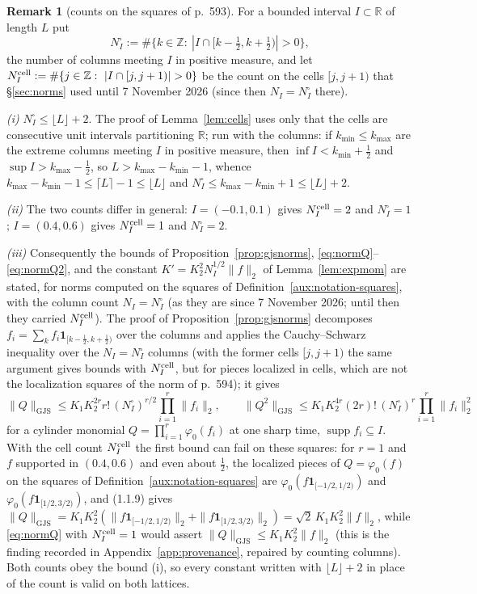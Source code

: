 \documentclass[11pt,a4paper]{article}
\theoremstyle{plain}
\theoremstyle{definition}
\theoremstyle{plain}
\theoremstyle{definition}
\newtheorem{auxrem}[auxlemma]{Remark}
\newcommand{\R}{\mathbb{R}}
\newcommand{\Z}{\mathbb{Z}}
\DeclareMathOperator{\supp}{supp}
\newcommand{\GJS}[1]{\lVert #1\rVert_{\mathrm{GJS}}}   %
\begin{document}
\begin{auxrem}[counts on the squares of p.~593]\label{aux:notation-counts}
For a bounded interval $I\subset\R$ of length $L$ put
\[
 N^{\square}_I:=\#\{k\in\Z:\ |I\cap[k-\tfrac12,k+\tfrac12)|>0\},
\]
the number of columns meeting $I$ in positive measure, and let
$N^{\rm cell}_I:=\#\{j\in\Z:\ |I\cap[j,j+1)|>0\}$ be the count on the cells $[j,j+1)$ that
\S\ref{sec:norms} used until 7 November 2026 (since then $N_I=N^\square_I$ there).

\emph{(i)} $N^{\square}_I\le\lfloor L\rfloor+2$.  The proof of Lemma~\ref{lem:cells}
uses only that the cells are consecutive unit intervals partitioning $\R$; run with the
columns: if $k_{\min}\le k_{\max}$ are the extreme columns meeting $I$ in positive measure,
then $\inf I<k_{\min}+\frac12$ and $\sup I>k_{\max}-\frac12$, so
$L>k_{\max}-k_{\min}-1$, whence $k_{\max}-k_{\min}-1\le\lceil L\rceil-1\le\lfloor
L\rfloor$ and $N^{\square}_I\le k_{\max}-k_{\min}+1\le\lfloor L\rfloor+2$.

\emph{(ii)} The two counts differ in general: $I=(-0.1,0.1)$ gives $N^{\rm cell}_I=2$ and
$N^{\square}_I=1$; $I=(0.4,0.6)$ gives $N^{\rm cell}_I=1$ and $N^{\square}_I=2$.

\emph{(iii)} Consequently the bounds of Proposition~\ref{prop:gjsnorms},
\eqref{eq:normQ}--\eqref{eq:normQ2}, and the constant $K'=K_2^2N_I^{1/2}\|f\|_2$ of
Lemma~\ref{lem:expmom} are stated, for norms computed on the squares of
Definition~\ref{aux:notation-squares}, with the column count $N_I=N^{\square}_I$ (as they are
since 7 November 2026; until then they carried $N^{\rm cell}_I$).  The proof of
Proposition~\ref{prop:gjsnorms} decomposes $f_i=\sum_kf_i\mathbf 1_{[k-\frac12,k+\frac12)}$ over
the columns and applies the Cauchy--Schwarz inequality over the $N_I=N^\square_I$ columns
(with the former cells $[j,j+1)$ the same argument gives bounds with $N^{\rm cell}_I$, but for
pieces localized in cells, which are not the localization squares of the norm of p.~594); it
gives
\[
 \GJS{Q}\le K_1K_2^{2r}r!\,(N^{\square}_I)^{r/2}\prod_{i=1}^r\|f_i\|_2 ,\qquad
 \GJS{Q^2}\le K_1K_2^{4r}(2r)!\,(N^{\square}_I)^{r}\prod_{i=1}^r\|f_i\|_2^2
 \tag{N.a}
\]
for a cylinder monomial $Q=\prod_{i=1}^r\varphi_0(f_i)$ at one sharp time, $\supp
f_i\subseteq I$.  With the cell count $N^{\rm cell}_I$ the first bound can fail on these squares: for $r=1$ and
$f$ supported in $(0.4,0.6)$ and even about $\frac12$, the localized pieces of
$Q=\varphi_0(f)$ on the squares of Definition~\ref{aux:notation-squares} are
$\varphi_0(f\mathbf 1_{[-1/2,1/2)})$ and $\varphi_0(f\mathbf 1_{[1/2,3/2)})$, and (1.1.9)
gives $\GJS{Q}=K_1K_2^2(\|f\mathbf 1_{[-1/2,1/2)}\|_2+\|f\mathbf
1_{[1/2,3/2)}\|_2)=\sqrt2\,K_1K_2^2\|f\|_2$, while \eqref{eq:normQ} with $N^{\rm cell}_I=1$
would assert $\GJS{Q}\le K_1K_2^2\|f\|_2$ (this is the finding recorded in
Appendix~\ref{app:provenance}, repaired by counting columns).  Both counts obey the bound
(i), so every constant written with $\lfloor L\rfloor+2$ in place of the count is valid on
both lattices.
\end{auxrem}
\end{document}
